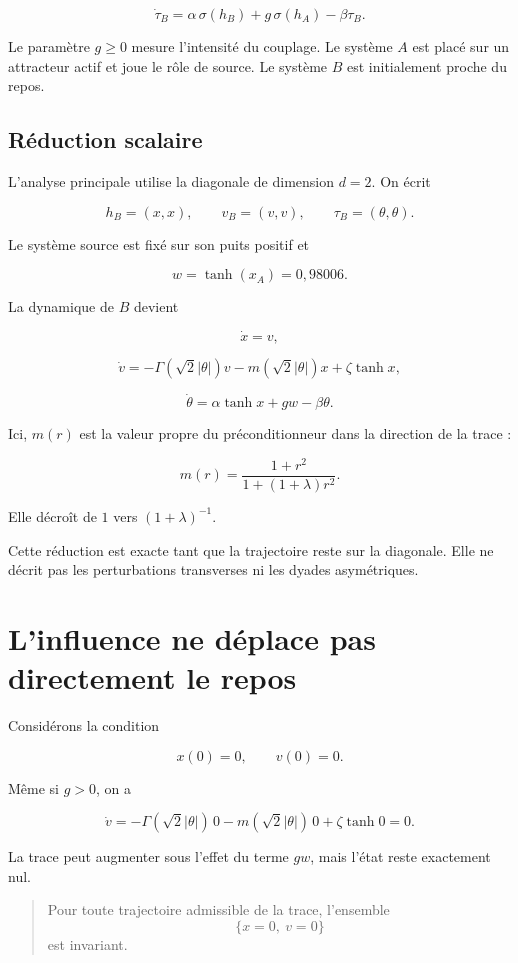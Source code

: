 \[
\dot\tau_B
=
\alpha\,\sigma(h_B)
+
g\,\sigma(h_A)
-
\beta\tau_B.
\]

Le paramètre \(g\geq0\) mesure l'intensité du couplage. Le système \(A\)
est placé sur un attracteur actif et joue le rôle de source. Le système
\(B\) est initialement proche du repos.

\section{Réduction scalaire}\label{t2-reduction-scalaire}

L'analyse principale utilise la diagonale de dimension \(d=2\). On écrit

\[
h_B=(x,x),
\qquad
v_B=(v,v),
\qquad
\tau_B=(\theta,\theta).
\]

Le système source est fixé sur son puits positif et

\[
w=\tanh(x_A)=0{,}98006.
\]

La dynamique de \(B\) devient

\[
\dot x=v,
\]

\[
\dot v
=
-\Gamma(\sqrt2|\theta|)v
-
m(\sqrt2|\theta|)x
+
\zeta\tanh x,
\]

\[
\dot\theta
=
\alpha\tanh x
+
gw
-
\beta\theta.
\]

Ici, \(m(r)\) est la valeur propre du préconditionneur dans la direction
de la trace :

\[
m(r)
=
\frac{1+r^2}{1+(1+\lambda)r^2}.
\]

Elle décroît de \(1\) vers \((1+\lambda)^{-1}\).

Cette réduction est exacte tant que la trajectoire reste sur la
diagonale. Elle ne décrit pas les perturbations transverses ni les
dyades asymétriques.

\chapter{L'influence ne déplace pas directement le repos}\label{t2-linfluence-ne-deplace-pas-directement-le-repos}

Considérons la condition

\[
x(0)=0,
\qquad
v(0)=0.
\]

Même si \(g>0\), on a

\[
\dot v
=
-\Gamma(\sqrt2|\theta|)\,0
-
m(\sqrt2|\theta|)\,0
+
\zeta\tanh 0
=0.
\]

La trace peut augmenter sous l'effet du terme \(gw\), mais l'état reste
exactement nul.

\begin{quote}
 Pour toute trajectoire
admissible de la trace, l'ensemble \[
\{x=0,\ v=0\}
\] est invariant.
\end{quote}

